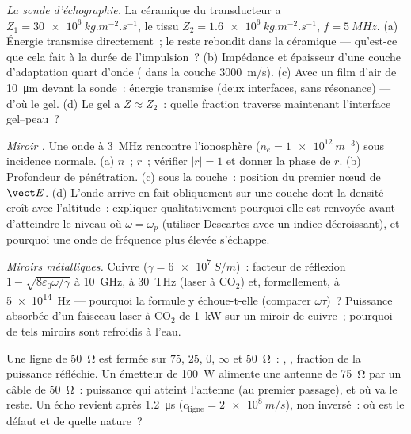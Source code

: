 \begin{exercise}[$\star\star$]\label{exo:b2:wave-interfaces:6}
\emph{La sonde d'échographie.} La céramique du transducteur a $Z_1 = \qty{30e6}{kg.m^{-2}.s^{-1}}$,
le tissu $Z_2 = \qty{1.6e6}{kg.m^{-2}.s^{-1}}$, $f = \qty{5}{MHz}$. (a) Énergie
transmise directement~; le reste rebondit dans la céramique --- qu'est-ce que
cela fait à la durée de l'impulsion~? (b) Impédance et épaisseur d'une
couche d'adaptation quart d'onde ( dans la couche \qty{3000}{m/s}).
(c) Avec un film d'air de \qty{10}{\micro m} devant la sonde~: énergie
transmise (deux interfaces, sans résonance) --- d'où le gel. (d) Le
gel a $Z \approx Z_2$~: quelle fraction traverse maintenant l'interface gel--peau~?
\end{exercise}

\begin{exercise}[$\star\star$]\label{exo:b2:wave-interfaces:7}
\emph{Miroir .} Une onde à \qty{3}{MHz} rencontre l'ionosphère ($n_e =
\qty{1e12}{m^{-3}}$) sous incidence normale. (a) $\underline n$~; $r$~; vérifier $|r| = 1$ et
donner la phase de $r$. (b) Profondeur de pénétration. (c)  sous la
couche~: position du premier nœud de $\vect E$. (d) L'onde arrive en fait
obliquement sur une couche dont la densité croît avec l'altitude~: expliquer
qualitativement pourquoi elle est renvoyée avant d'atteindre le niveau où
$\omega = \omega_p$ (utiliser Descartes avec un indice décroissant), et pourquoi une onde de
fréquence plus élevée s'échappe.
\end{exercise}

\begin{exercise}[$\star\star$]\label{exo:b2:wave-interfaces:8}
\emph{Miroirs métalliques.} Cuivre ($\gamma = \qty{6e7}{S/m}$)~: facteur de réflexion $1 -
\sqrt{8\varepsilon_0\omega/\gamma}$ à \qty{10}{GHz}, à \qty{30}{THz} (laser à CO$_2$) et,
formellement, à \qty{5e14}{Hz} --- pourquoi la formule y échoue-t-elle (comparer
$\omega\tau$)~? Puissance absorbée d'un faisceau laser à CO$_2$ de \qty{1}{kW} sur un miroir
de cuivre~; pourquoi de tels miroirs sont refroidis à l'eau.
\end{exercise}

\begin{exercise}[$\star\star$]\label{exo:b2:wave-interfaces:9}
Une ligne de \qty{50}{\ohm} est fermée sur $75$, $25$, $0$, $\infty$ et \qty{50}{\ohm}~:
, , fraction de la puissance
réfléchie. Un émetteur de \qty{100}{W} alimente une antenne de \qty{75}{\ohm}
par un câble de \qty{50}{\ohm}~: puissance qui atteint l'antenne (au premier passage),
et où va le reste. Un écho revient après \qty{1.2}{\micro s} ($c_{\text{ligne}}
= \qty{2e8}{m/s}$), non inversé~: où est le défaut et de quelle nature~?
\end{exercise}

